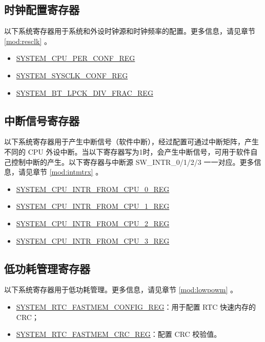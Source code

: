\documentclass[main\_\_CN.tex]{subfiles}
\begin{document}
\subsection{时钟配置寄存器}

以下系统寄存器用于系统和外设时钟源和时钟频率的配置。更多信息，请见章节 \ref{mod:resclk}
\textit{}。

\begin{itemize}
    \item \hyperref[regdesc:SYSTEMCPUPERCONFREG]{SYSTEM\_CPU\_PER\_CONF\_REG}
    \item \hyperref[regdesc:SYSTEMSYSCLKCONFREG]{SYSTEM\_SYSCLK\_CONF\_REG}
    \item \hyperref[regdesc:SYSTEMBTLPCKDIVFRACREG]{SYSTEM\_BT\_LPCK\_DIV\_FRAC\_REG}
\end{itemize}

\subsection{中断信号寄存器}

以下系统寄存器用于产生中断信号（软件中断），经过配置可通过中断矩阵，产生不同的 CPU 外设中断。当以下寄存器写为1时，会产生中断信号，可用于软件自己控制中断的产生。以下寄存器与中断源 SW\_INTR\_0/1/2/3 一一对应。更多信息，请见章节 \ref{mod:intmtrx}
\textit{}。

\begin{itemize}
    \item \hyperref[regdesc:SYSTEMCPUINTRFROMCPU0REG]{SYSTEM\_CPU\_INTR\_FROM\_CPU\_0\_REG}
    \item \hyperref[regdesc:SYSTEMCPUINTRFROMCPU1REG]{SYSTEM\_CPU\_INTR\_FROM\_CPU\_1\_REG}
    \item \hyperref[regdesc:SYSTEMCPUINTRFROMCPU2REG]{SYSTEM\_CPU\_INTR\_FROM\_CPU\_2\_REG}
    \item \hyperref[regdesc:SYSTEMCPUINTRFROMCPU3REG]{SYSTEM\_CPU\_INTR\_FROM\_CPU\_3\_REG}
\end{itemize}

\subsection{低功耗管理寄存器}

以下系统寄存器用于低功耗管理。更多信息，请见章节 \ref{mod:lowpowm} \textit{}。
\begin{itemize}
    \item \hyperref[regdesc:SYSTEMRTCFASTMEMCONFIGREG]{SYSTEM\_RTC\_FASTMEM\_CONFIG\_REG}：用于配置 RTC 快速内存的 CRC；
    \item \hyperref[regdesc:SYSTEMRTCFASTMEMCRCREG]{SYSTEM\_RTC\_FASTMEM\_CRC\_REG}：配置 CRC 校验值。
\end{itemize}
\end{document}
